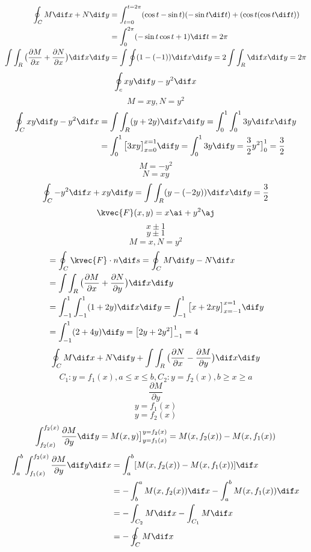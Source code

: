\begin{align*}
\oint_{C}M\dif x+N\dif y&=\int_{t=0}^{t=2\pi}(\cos{t}-\sin{t})(-\sin{t}\dif t)+(\cos{t}(\cos{t}\dif t))\\
&=\int_{0}^{2\pi}(-\sin{t}\cos{t}+1)\dif t=2\pi\\
\int \int_{R}\big(\frac{\partial{M}}{\partial{x}}+\frac{\partial{N}}{\partial{x}}\big)\dif x\dif y&=\int \oint(1-(-1))\dif x\dif y=2\int \int_{R}\dif x\dif y=2\pi\\
\end{align*}
\[\oint_{c}xy\dif y-y^{2}\dif x\]
\[M=xy,N=y^{2}\]
\begin{align*}
\oint_{C}xy\dif y -y^{2}\dif x&=\int \int_{R}(y+2y)\dif x\dif y=\int_{0}^{1}\int_{0}^{1}3y\dif x\dif y\\
&=\int_{0}^{1}\big[3xy\big]_{x=0}^{x=1}\dif y=\int_{0}^{1}3y\dif y=\frac{3}{2}y^{2}\big]_{0}^{1}=\frac{3}{2}\\
\end{align*}
\[M=-y^{2}\]
\[N=xy\]
\[\oint_{C}-y^{2}\dif x+xy\dif y=\int \int_{R}(y-(-2y))\dif x\dif y=\frac{3}{2}\]
\[\kvec{F}(x,y)=x\ai+y^{2}\aj\]
\[x\pm1\]
\[y\pm1\]
\[M=x,N=y^{2}\]
\begin{align*}
&=\oint_{C}\kvec{F}\cdot n\dif s=\oint_{C}M\dif y-N\dif x\\
&=\int \int_{R}\big(\frac{\partial{M}}{\partial{x}}+\frac{\partial{N}}{\partial{y}}\big)\dif x\dif y\\
&=\int_{-1}^{1}\int_{-1}^{1}(1+2y)\dif x\dif y=\int_{-1}^{1}\big[x+2xy\big]_{x=-1}^{x=1}\dif y\\
&=\int_{-1}^{1}(2+4y)\dif y=\big[2y+2y^{2}\big]_{-1}^{1}=4\\
\end{align*}
\[\oint_{C}M\dif x+N\dif y+\int \int_{R}\big(\frac{\partial{N}}{\partial{x}}-\frac{\partial{M}}{\partial{y}}\big)\dif x\dif y\]
\[C_{1}:y=f_{1}(x),a\le x\le b, C_{2}: y=f_{2}(x),b\ge x\ge a\]
\[\frac{\partial{M}}{\partial{y}}\]
\[y=f_{1}(x)\]
\[y=f_{2}(x)\]
\[\int_{f_{2}(x)}^{f_{2}(x)}\frac{\partial{M}}{\partial{y}}\dif y=M(x,y)\big]_{y=f_{1}(x)}^{y=f_{2}(x)}=M(x,f_{2}(x))-M(x,f_{1}(x))\]
\begin{align*}
\int_{a}^{b}\int_{f_{1}(x)}^{f_{2}(x)}\frac{\partial{M}}{\partial{y}}\dif y\dif x&=\int_{a}^{b}[M(x,f_{2}(x))-M(x,f_{1}(x))]\dif x\\
&=-\int_{b}^{a}M(x,f_{2}(x))\dif x-\int_{a}^{b}M(x,f_{1}(x))\dif x\\
&=-\int_{C_{2}}M\dif x-\int_{C_{1}}M\dif x\\
&=-\oint_{C}M\dif x\\
\end{align*}

